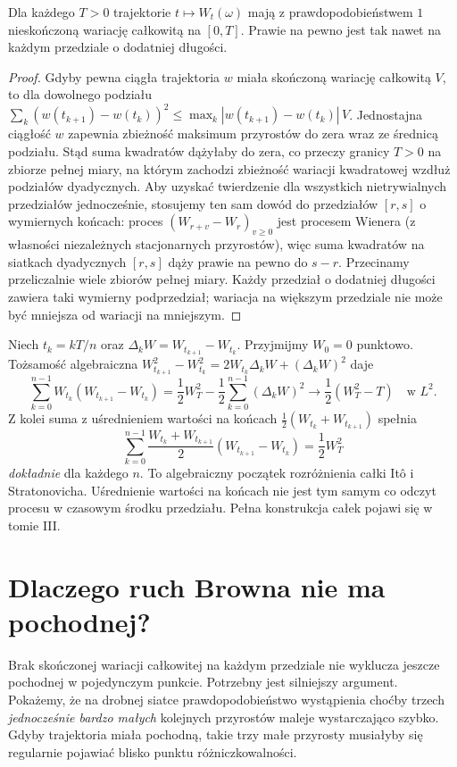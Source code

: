 \begin{wniosek}
Dla każdego $T>0$ trajektorie $t\mapsto W_t(\omega)$
mają z prawdopodobieństwem $1$ nieskończoną wariację
całkowitą na $[0,T]$. Prawie na pewno jest tak nawet
na każdym przedziale o dodatniej długości.
\end{wniosek}
\begin{proof}
Gdyby pewna ciągła trajektoria $w$ miała skończoną
wariację całkowitą $V$, to dla dowolnego podziału
$\sum_k(w(t_{k+1})-w(t_k))^2
\le\max_k|w(t_{k+1})-w(t_k)|\,V$.
Jednostajna ciągłość $w$ zapewnia zbieżność maksimum
przyrostów do zera wraz ze średnicą podziału.
Stąd suma kwadratów dążyłaby do zera, co przeczy
granicy $T>0$ na zbiorze pełnej miary, na którym
zachodzi zbieżność wariacji kwadratowej wzdłuż
podziałów dyadycznych.
Aby uzyskać twierdzenie dla wszystkich nietrywialnych
przedziałów jednocześnie, stosujemy ten sam dowód do
przedziałów $[r,s]$ o wymiernych końcach: proces
$(W_{r+v}-W_r)_{v\ge0}$ jest procesem Wienera
(z własności niezależnych stacjonarnych przyrostów),
więc suma kwadratów na siatkach dyadycznych
$[r,s]$ dąży prawie na pewno do $s-r$.
Przecinamy przeliczalnie wiele zbiorów pełnej miary.
Każdy przedział o dodatniej długości zawiera taki
wymierny podprzedział; wariacja na większym przedziale
nie może być mniejsza od wariacji na mniejszym.
\end{proof}

\begin{przyklad}
Niech $t_k=kT/n$ oraz $\Delta_kW=W_{t_{k+1}}-W_{t_k}$.
Przyjmijmy $W_0=0$ punktowo. Tożsamość algebraiczna
$W_{t_{k+1}}^2-W_{t_k}^2
=2W_{t_k}\Delta_kW+(\Delta_kW)^2$
daje
\[
\sum_{k=0}^{n-1}W_{t_k}(W_{t_{k+1}}-W_{t_k})
=\frac12W_T^2-\frac12\sum_{k=0}^{n-1}(\Delta_kW)^2
\longrightarrow \frac12(W_T^2-T)
\quad\text{w }L^2.
\]
Z kolei suma z uśrednieniem wartości na końcach
$\frac12(W_{t_k}+W_{t_{k+1}})$ spełnia
\[
\sum_{k=0}^{n-1}\frac{W_{t_k}+W_{t_{k+1}}}{2}
 (W_{t_{k+1}}-W_{t_k})=\frac12W_T^2
\]
\emph{dokładnie} dla każdego $n$.
To algebraiczny początek rozróżnienia całki Itô i
Stratonovicha. Uśrednienie wartości na końcach nie jest tym samym
co odczyt procesu w czasowym środku przedziału.
Pełna konstrukcja całek pojawi się w tomie III.
\end{przyklad}

\section{Dlaczego ruch Browna nie ma pochodnej?}
Brak skończonej wariacji całkowitej na każdym przedziale nie
wyklucza jeszcze pochodnej w pojedynczym punkcie. Potrzebny
jest silniejszy argument. Pokażemy, że na drobnej siatce
prawdopodobieństwo wystąpienia choćby trzech \emph{jednocześnie
bardzo małych} kolejnych przyrostów maleje wystarczająco szybko.
Gdyby trajektoria miała pochodną, takie trzy małe przyrosty
musiałyby się regularnie pojawiać blisko punktu różniczkowalności.


